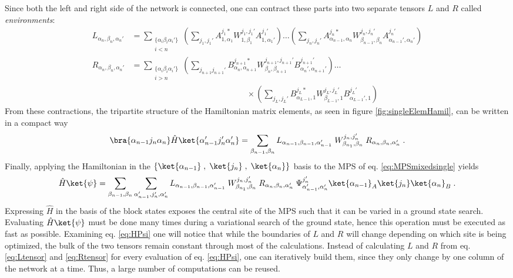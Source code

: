 Since both the left and right side of the network is connected, one can contract these parts into two separate tensors $L$ and $R$ called \textit{environments}:
\begin{align}
	L_{\alpha_{n}, \beta_{n} , \alpha_{n} '} &= \sum_{ \substack{ \{ \alpha_i \beta_i \alpha_i ' \} \\ i < n}} \left( \sum_{j_1 , j_1 '} A_{1 , \alpha_1}^{j_1 *} W_{1, \beta_1}^{j_1 , j_1 '} A_{1 , \alpha_1 '}^{j_1 '} \right) \ldots \left( \sum_{j_{n} , j_{n} '} A_{\alpha_{n-1} , \alpha_{n}}^{j_{n} *} W_{\beta_{n-1}, \beta_{n}}^{j_{n} , j_{n} '} A_{\alpha_{n-1} ' , \alpha_{n} '}^{j_{n} '} \right) \label{eq:Ltensor} \\
	R_{\alpha_{n} ,\beta_{n} , \alpha_{n} '} &= \sum_{ \substack{ \{ \alpha_i \beta_i \alpha_i ' \} \\ i > n}} \left( \sum_{j_{n+1}  j_{n+1} '} B_{\alpha_n , \alpha_{n+1}}^{j_{n+1} *} W_{\beta_n, \beta_{n+1}}^{j_{n+1} , j_{n+1} '} B_{\alpha_n ', \alpha_{n+1} '}^{j_{n+1} '} \right) \ldots \nonumber \\
	& \qquad \qquad \qquad \qquad \qquad \qquad \qquad \times \left( \sum_{j_{L} , j_{L} '} B_{\alpha_{L-1} , 1}^{j_{L} *} W_{\beta_{L-1}, 1}^{j_{L} , j_{L} '} B_{\alpha_{L-1}' , 1 }^{j_{L} '} \right) \label{eq:Rtensor}
\end{align}
From these contractions, the tripartite structure of the Hamiltonian matrix elements, as seen in figure \ref{fig:singleElemHamil}, can be written in a compact way
\begin{equation}
	\bra{\alpha_{n-1} j_n \alpha_{n}} \hat{H} \ket{\alpha_{n-1} ' j_n ' \alpha_{n} '} = \sum_{\beta_{n-1} , \beta_{n}} L_{\alpha_{n-1}, \beta_{n-1} , \alpha_{n-1} '} \; W_{\beta_{n_1}, \beta_n}^{j_n , j_n '} \; R_{\alpha_{n} ,\beta_{n} , \alpha_{n} '} \; .
\end{equation}
Finally, applying the Hamiltonian in the $\{ \ket{\alpha_{n-1} } \; , \; \ket{ j_n } \; , \; \ket{\alpha_{n} } \}$ basis to the MPS of eq. \eqref{eq:MPSmixedsingle} yields \cite{schollwock}
\begin{equation}
	\hat{H} \ket{\psi} = \sum_{\beta_{n-1} , \beta_{n}} \sum_{\alpha_{n-1}' , j_n ', \alpha_{n}'} L_{\alpha_{n-1}, \beta_{n-1} , \alpha_{n-1} '} \; W_{\beta_{n_1}, \beta_n}^{j_n , j_n '} \; R_{\alpha_{n} ,\beta_{n} , \alpha_{n} '} \; \Psi_{\alpha_{n-1} ' , \alpha_{n} '}^{j_n '} \ket{\alpha_{n-1}}_A \ket{j_n} \ket{\alpha_{n}}_B \; .
	\label{eq:HPsi}
\end{equation}
Expressing $\hat{H}$ in the basis of the block states exposes the central site of the MPS such that it can be varied in a ground state search. Evaluating $\hat{H} \ket{\psi}$ must be done many times during a variational search of the ground state, hence this operation must be executed as fast as possible. Examining eq. \eqref{eq:HPsi} one will notice that while the boundaries of $L$ and $R$ will change depending on which site is being optimized, the bulk of the two tensors remain constant through most of the calculations. Instead of calculating $L$ and $R$ from eq. \eqref{eq:Ltensor} and \eqref{eq:Rtensor} for every evaluation of eq. \eqref{eq:HPsi}, one can iteratively build them, since they only change by one column of the network at a time. Thus, a large number of computations can be reused.\\
